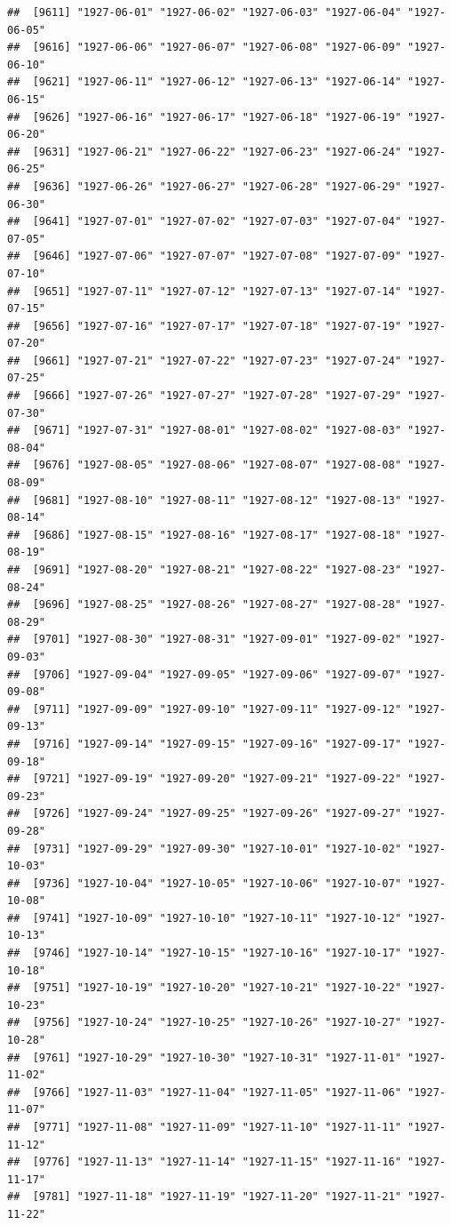 \documentclass{article}\usepackage[]{graphicx}\usepackage[]{color}
\makeatletter
\newenvironment{kframe}{%
 \def\at@end@of@kframe{}%
 \ifinner\ifhmode%
  \def\at@end@of@kframe{\end{minipage}}%
  \begin{minipage}{\columnwidth}%
 \fi\fi%
 \def\FrameCommand##1{\hskip\@totalleftmargin \hskip-\fboxsep
 \colorbox{shadecolor}{##1}\hskip-\fboxsep
     \hskip-\linewidth \hskip-\@totalleftmargin \hskip\columnwidth}%
 \MakeFramed {\advance\hsize-\width
   \@totalleftmargin\z@ \linewidth\hsize
   \@setminipage}}%
 {\par\unskip\endMakeFramed%
 \at@end@of@kframe}
\newenvironment{knitrout}{}{} %
\makeatother
\begin{document}
\begin{description}
\begin{knitrout}
\begin{kframe}
\begin{verbatim}
##  [9611] "1927-06-01" "1927-06-02" "1927-06-03" "1927-06-04" "1927-06-05"
##  [9616] "1927-06-06" "1927-06-07" "1927-06-08" "1927-06-09" "1927-06-10"
##  [9621] "1927-06-11" "1927-06-12" "1927-06-13" "1927-06-14" "1927-06-15"
##  [9626] "1927-06-16" "1927-06-17" "1927-06-18" "1927-06-19" "1927-06-20"
##  [9631] "1927-06-21" "1927-06-22" "1927-06-23" "1927-06-24" "1927-06-25"
##  [9636] "1927-06-26" "1927-06-27" "1927-06-28" "1927-06-29" "1927-06-30"
##  [9641] "1927-07-01" "1927-07-02" "1927-07-03" "1927-07-04" "1927-07-05"
##  [9646] "1927-07-06" "1927-07-07" "1927-07-08" "1927-07-09" "1927-07-10"
##  [9651] "1927-07-11" "1927-07-12" "1927-07-13" "1927-07-14" "1927-07-15"
##  [9656] "1927-07-16" "1927-07-17" "1927-07-18" "1927-07-19" "1927-07-20"
##  [9661] "1927-07-21" "1927-07-22" "1927-07-23" "1927-07-24" "1927-07-25"
##  [9666] "1927-07-26" "1927-07-27" "1927-07-28" "1927-07-29" "1927-07-30"
##  [9671] "1927-07-31" "1927-08-01" "1927-08-02" "1927-08-03" "1927-08-04"
##  [9676] "1927-08-05" "1927-08-06" "1927-08-07" "1927-08-08" "1927-08-09"
##  [9681] "1927-08-10" "1927-08-11" "1927-08-12" "1927-08-13" "1927-08-14"
##  [9686] "1927-08-15" "1927-08-16" "1927-08-17" "1927-08-18" "1927-08-19"
##  [9691] "1927-08-20" "1927-08-21" "1927-08-22" "1927-08-23" "1927-08-24"
##  [9696] "1927-08-25" "1927-08-26" "1927-08-27" "1927-08-28" "1927-08-29"
##  [9701] "1927-08-30" "1927-08-31" "1927-09-01" "1927-09-02" "1927-09-03"
##  [9706] "1927-09-04" "1927-09-05" "1927-09-06" "1927-09-07" "1927-09-08"
##  [9711] "1927-09-09" "1927-09-10" "1927-09-11" "1927-09-12" "1927-09-13"
##  [9716] "1927-09-14" "1927-09-15" "1927-09-16" "1927-09-17" "1927-09-18"
##  [9721] "1927-09-19" "1927-09-20" "1927-09-21" "1927-09-22" "1927-09-23"
##  [9726] "1927-09-24" "1927-09-25" "1927-09-26" "1927-09-27" "1927-09-28"
##  [9731] "1927-09-29" "1927-09-30" "1927-10-01" "1927-10-02" "1927-10-03"
##  [9736] "1927-10-04" "1927-10-05" "1927-10-06" "1927-10-07" "1927-10-08"
##  [9741] "1927-10-09" "1927-10-10" "1927-10-11" "1927-10-12" "1927-10-13"
##  [9746] "1927-10-14" "1927-10-15" "1927-10-16" "1927-10-17" "1927-10-18"
##  [9751] "1927-10-19" "1927-10-20" "1927-10-21" "1927-10-22" "1927-10-23"
##  [9756] "1927-10-24" "1927-10-25" "1927-10-26" "1927-10-27" "1927-10-28"
##  [9761] "1927-10-29" "1927-10-30" "1927-10-31" "1927-11-01" "1927-11-02"
##  [9766] "1927-11-03" "1927-11-04" "1927-11-05" "1927-11-06" "1927-11-07"
##  [9771] "1927-11-08" "1927-11-09" "1927-11-10" "1927-11-11" "1927-11-12"
##  [9776] "1927-11-13" "1927-11-14" "1927-11-15" "1927-11-16" "1927-11-17"
##  [9781] "1927-11-18" "1927-11-19" "1927-11-20" "1927-11-21" "1927-11-22"

\end{verbatim}
\end{kframe}
\end{knitrout}
\end{description}
\end{document}
